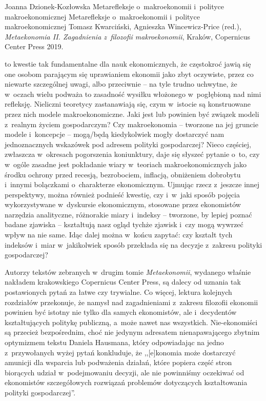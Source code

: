 \begin{recplenv}{Joanna Dzionek-Kozłowska}
	{Metarefleksje o~makroekonomii i~polityce makroekonomicznej}
	{Metarefleksje o~makroekonomii i~polityce makroekonomicznej}
	{Tomasz Kwarciński, Agnieszka Wincewicz-Price (red.), \textit{Metaekonomia II. Zagadnienia z~filozofii makroekonomii},
		Kraków, Copernicus Center Press 2019.}





 to kwestie tak fundamentalne dla nauk ekonomicznych, że częstokroć jawią się one osobom
parającym się uprawianiem ekonomii jako zbyt oczywiste, przez co niewarte szczególnej uwagi, albo przeciwnie -- na tyle
trudno uchwytne, że w~oczach wielu podważa to zasadność wysiłku włożonego w~pogłębioną nad nimi refleksję. Nieliczni
teoretycy zastanawiają się, czym w~istocie są konstruowane przez nich modele makroekonomiczne. Jaki jest lub powinien
być związek modeli z~realnym życiem gospodarczym? Czy makroekonomia -- tworzone na jej gruncie
modele i~koncepcje -- \mbox{mogą/będą} kiedykolwiek
mogły dostarczyć nam jednoznacznych wskazówek pod adresem polityki gospodarczej? Nieco częściej,
zwłaszcza w~okresach pogorszenia koniunktury, daje się słyszeć pytanie o~to, czy w~ogóle zasadne jest pokładanie wiary
w~teoriach makroekonomicznych jako środku ochrony przed recesją, bezrobociem, inflacją, obniżeniem dobrobytu i~innymi
bolączkami o~charakterze ekonomicznym. Ujmując rzecz z~jeszcze innej perspektywy, można również podnieść kwestię,
czy i~w~jaki sposób pojęcia wykorzystywane w~dyskursie ekonomicznym, stosowane przez ekonomistów narzędzia analityczne,
różnorakie miary i~indeksy -- tworzone, by lepiej poznać badane zjawiska -- kształtują nasz ogląd tychże zjawisk i~czy
mogą wywrzeć wpływ na nie same. Idąc dalej można w~końcu zapytać: czy kształt tych indeksów i~miar w~jakikolwiek sposób
przekłada się na decyzje z~zakresu polityki gospodarczej? 

Autorzy tekstów zebranych w~drugim tomie \textit{Metaekonomii}, wydanego właśnie nakładem krakowskiego Copernicus Center
Press, są dalecy od uznania tak postawionych pytań za łatwe czy trywialne. Co więcej, lektura kolejnych rozdziałów
przekonuje, że namysł nad zagadnieniami z~zakresu filozofii ekonomii powinien być istotny nie tylko dla samych
ekonomistów, ale i~decydentów kształtujących politykę publiczną, a~może nawet nas wszystkich. Nie-ekonomiści są
przecież bezpośrednim, choć nie jedynym adresatem nienapawającego zbytnim optymizmem tekstu Daniela Hausmana, który
odpowiadając na jedno z~przywołanych wyżej pytań konkluduje, że ,,[e]konomia może dostarczyć amunicji dla wsparcia lub
podważenia działań, które popiera część stron biorących udział w~podejmowaniu decyzji, ale nie powinniśmy oczekiwać od
ekonomistów szczegółowych rozwiązań problemów dotyczących kształtowania polityki gospodarczej''.


\end{recplenv}
